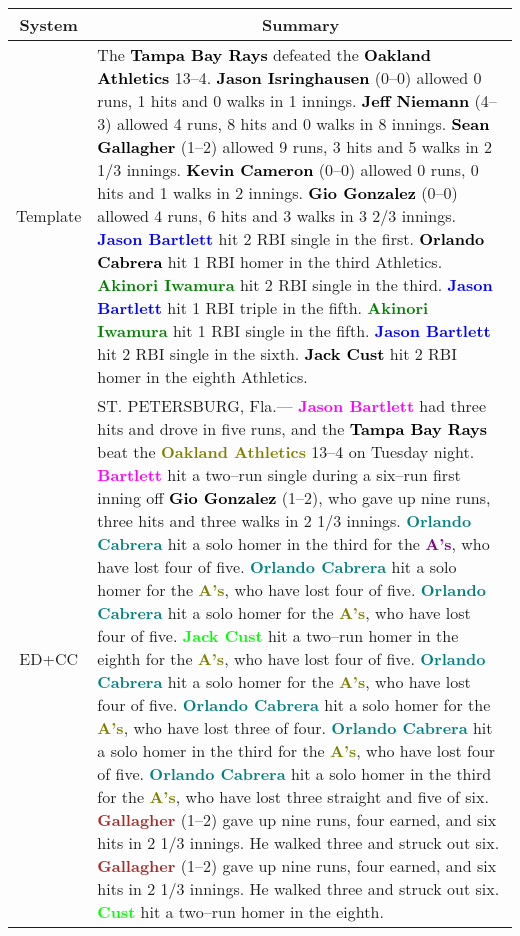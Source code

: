 \documentclass[11pt,a4paper]{article}
\begin{document}
\begin{table*}
\small
\centering
\begin{tabular}{|c|p{13.5cm}|}
\hline 
System & \multicolumn{1}{c|}{Summary} \\ 
\hline 
Template & 
The \textcolor{black}{\textbf{Tampa Bay Rays}} defeated the \textcolor{black}{\textbf{Oakland Athletics}} 13--4. \textcolor{black}{\textbf{Jason Isringhausen}} (0--0) allowed 0 runs, 1 hits and 0 walks in 1 innings. \textcolor{black}{\textbf{Jeff Niemann}} (4--3) allowed 4 runs, 8 hits and 0 walks in 8 innings. \textcolor{black}{\textbf{Sean Gallagher}} (1--2) allowed 9 runs, 3 hits and 5 walks in 2 1/3 innings. \textcolor{black}{\textbf{Kevin Cameron}} (0--0) allowed 0 runs, 0 hits and 1 walks in 2 innings. \textcolor{black}{\textbf{Gio Gonzalez}} (0--0) allowed 4 runs, 6 hits and 3 walks in 3 2/3 innings. \textcolor{blue}{\textbf{Jason Bartlett}} hit 2 RBI single in the first. \textcolor{black}{\textbf{Orlando Cabrera}} hit 1 RBI homer in the third Athletics. \textcolor{green}{\textbf{Akinori Iwamura}} hit 2 RBI single in the third. \textcolor{blue}{\textbf{Jason Bartlett}} hit 1 RBI triple in the fifth. \textcolor{green}{\textbf{Akinori Iwamura}} hit 1 RBI single in the fifth. \textcolor{blue}{\textbf{Jason Bartlett}} hit 2 RBI single in the sixth. \textcolor{black}{\textbf{Jack Cust}} hit 2 RBI homer in the eighth Athletics.
\\ 
\hline 
ED+CC &
ST. PETERSBURG, Fla.--- \textcolor{magenta}{\textbf{Jason Bartlett}} had three hits and drove in five runs, and the \textcolor{black}{\textbf{Tampa Bay Rays}} beat the \textcolor{olive}{\textbf{Oakland Athletics}} 13--4 on Tuesday night. \textcolor{magenta}{\textbf{Bartlett}} hit a two--run single during a six--run first inning off \textcolor{black}{\textbf{Gio Gonzalez}} (1--2), who gave up nine runs, three hits and three walks in 2 1/3 innings. \textcolor{teal}{\textbf{Orlando Cabrera}} hit a solo homer in the third for the \textcolor{purple}{\textbf{A's}}, who have lost four of five. \textcolor{teal}{\textbf{Orlando Cabrera}} hit a solo homer for the \textcolor{olive}{\textbf{A's}}, who have lost four of five. \textcolor{teal}{\textbf{Orlando Cabrera}} hit a solo homer for the \textcolor{olive}{\textbf{A's}}, who have lost four of five. \textcolor{lime}{\textbf{Jack Cust}} hit a two--run homer in the eighth for the \textcolor{olive}{\textbf{A's}}, who have lost four of five. \textcolor{teal}{\textbf{Orlando Cabrera}} hit a solo homer for the \textcolor{olive}{\textbf{A's}}, who have lost four of five. \textcolor{teal}{\textbf{Orlando Cabrera}} hit a solo homer for the \textcolor{olive}{\textbf{A's}}, who have lost three of four. \textcolor{teal}{\textbf{Orlando Cabrera}} hit a solo homer in the third for the \textcolor{olive}{\textbf{A's}}, who have lost four of five. \textcolor{teal}{\textbf{Orlando Cabrera}} hit a solo homer in the third for the \textcolor{olive}{\textbf{A's}}, who have lost three straight and five of six. \textcolor{brown}{\textbf{Gallagher}} (1--2) gave up nine runs, four earned, and six hits in 2 1/3 innings. He walked three and struck out six. \textcolor{brown}{\textbf{Gallagher}} (1--2) gave up nine runs, four earned, and six hits in 2 1/3 innings. He walked three and struck out six. \textcolor{lime}{\textbf{Cust}}  hit a two--run homer in the eighth.

\end{tabular}
\end{table*}
\end{document}

